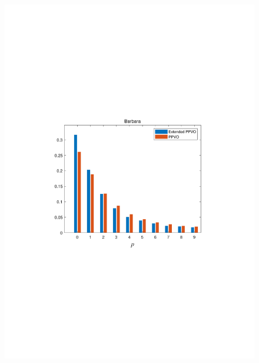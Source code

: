 \documentclass[review,3p,10pt,sort&compress]{elsarticle}
\begin{document}
\begin{figure}
{\begin{minipage}[t]{0.225\linewidth}
    \includegraphics[width=1\textwidth]{figures/Comparison/barbara.pdf}
    \end{minipage}
}



\end{figure}
\end{document}
